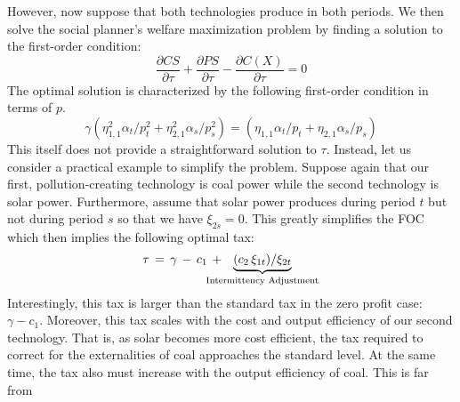 \documentclass[12pt,a4paper]{extarticle}
\begin{document}
However, now suppose that both technologies produce in both periods. We then solve the social planner's welfare maximization problem by finding a solution to the first-order condition:
$$\frac{\partial CS}{\partial \tau} + \frac{\partial PS}{\partial \tau} - \frac{\partial C(X)}{\partial \tau} = 0$$
The optimal solution is characterized by the following first-order condition in terms of $p$.
$$
\gamma \left( \eta_{1,1}^2 \alpha_t / p_t^2 + \eta_{2,1}^2 \alpha_s / p_s^2 \right) = \left(\eta_{1,1} \alpha_t /p_t + \eta_{2,1} \alpha_s / p_s \right) $$
This itself does not provide a straightforward solution to $\tau$. Instead, let us consider a practical example to simplify the problem. Suppose again that our first, pollution-creating technology is coal power while the second technology is solar power. Furthermore, assume that solar power produces during period $t$ but not during period $s$ so that we have $\xi_{2s} = 0$. This greatly simplifies the FOC which then implies the following optimal tax:
$$\tau \, = \,  \gamma \, - \, c_1 \, +  \hspace{-1.5em} \underbrace{(c_2 \, \xi_{1t})/ \xi_{2t}}_\textrm{Intermittency Adjustment}$$
Interestingly, this tax is larger than the standard tax in the zero profit case: $\gamma - c_1$. Moreover, this tax scales with the cost and output efficiency of our second technology. That is, as solar becomes more cost efficient, the tax required to correct for the externalities of coal approaches the standard level. At the same time, the tax also must increase with the output efficiency of coal. This is far from 
\end{document}
